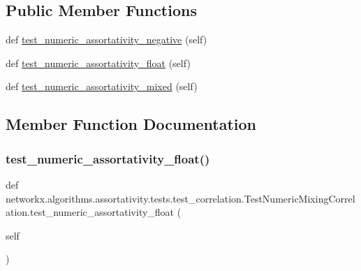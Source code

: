 \subsection*{Public Member Functions}
\begin{DoxyCompactItemize}
\item 
def \hyperlink{classnetworkx_1_1algorithms_1_1assortativity_1_1tests_1_1test__correlation_1_1TestNumericMixingCorrelation_ab11440a4a6b501c86dc3a955fac979b8}{test\+\_\+numeric\+\_\+assortativity\+\_\+negative} (self)
\item 
def \hyperlink{classnetworkx_1_1algorithms_1_1assortativity_1_1tests_1_1test__correlation_1_1TestNumericMixingCorrelation_af112d2e68cd89738356a855aea469897}{test\+\_\+numeric\+\_\+assortativity\+\_\+float} (self)
\item 
def \hyperlink{classnetworkx_1_1algorithms_1_1assortativity_1_1tests_1_1test__correlation_1_1TestNumericMixingCorrelation_ab0a1e9c2821b556735529ef23c7bfb38}{test\+\_\+numeric\+\_\+assortativity\+\_\+mixed} (self)
\end{DoxyCompactItemize}


\subsection{Member Function Documentation}
\mbox{\label{classnetworkx_1_1algorithms_1_1assortativity_1_1tests_1_1test__correlation_1_1TestNumericMixingCorrelation_af112d2e68cd89738356a855aea469897}} 
\subsubsection{\texorpdfstring{test\+\_\+numeric\+\_\+assortativity\+\_\+float()}{test\_numeric\_assortativity\_float()}}
{\footnotesize\ttfamily def networkx.\+algorithms.\+assortativity.\+tests.\+test\+\_\+correlation.\+Test\+Numeric\+Mixing\+Correlation.\+test\+\_\+numeric\+\_\+assortativity\+\_\+float (\begin{DoxyParamCaption}\item[{}]{self }\end{DoxyParamCaption})}

